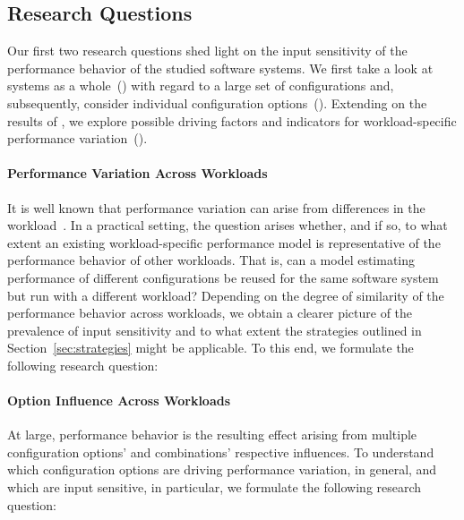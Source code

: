 \subsection{Research Questions}
Our first two research questions shed light on the input sensitivity of the performance behavior of the studied software systems. We first take a look at systems as a whole~() with regard to a large set of configurations and, subsequently, consider individual configuration options~(). Extending on the results of , we explore possible driving factors and indicators for workload-specific performance variation~().

\paragraph{Performance Variation Across Workloads}
It is well known that performance variation can arise from differences in the workload~\cite{benchmarking_book}. In a practical setting, the question arises whether, and if so, to what extent an existing workload-specific performance model is representative of the performance behavior of other workloads. 
That is, can a model estimating performance of different configurations be reused for the same software system but run with a different workload? Depending on the degree of similarity of the performance behavior across workloads, we obtain a clearer picture of the prevalence of input sensitivity and to what extent the strategies outlined in  Section~\ref{sec:strategies} might be applicable.
To this end, we formulate the following research question: 


\paragraph{Option Influence Across Workloads}
At large, performance behavior is the resulting effect arising from multiple configuration options’ and combinations’ respective influences. To understand which configuration options are driving performance variation, in general, and which are input sensitive, in particular, we formulate the following research question:


